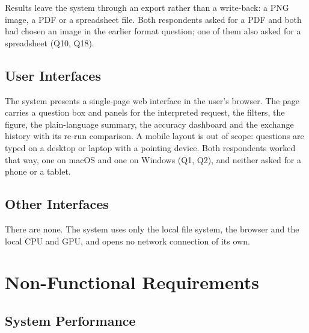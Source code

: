 \documentclass[12pt,a4paper]{report}
\begin{document}
Results leave the system through an export rather than a write-back: a PNG
image, a PDF or a spreadsheet file. Both respondents asked for a PDF and both
had chosen an image in the earlier format question; one of them also asked
for a spreadsheet (Q10, Q18).

\section{User Interfaces}
\label{sec:user-interfaces}

The system presents a single-page web interface in the user's browser. The
page carries a question box and panels for the interpreted request, the
filters, the figure, the plain-language summary, the accuracy dashboard and
the exchange history with its re-run comparison. A mobile layout is out of
scope: questions are typed on a desktop or laptop with a pointing device.
Both respondents worked that way, one on macOS and one on Windows (Q1, Q2),
and neither asked for a phone or a tablet.

\section{Other Interfaces}
\label{sec:other-interfaces}

There are none. The system uses only the local file system, the browser and
the local CPU and GPU, and opens no network connection of its own.

\chapter{Non-Functional Requirements}
\label{ch:nfr}

\section{System Performance}
\label{sec:performance}
\end{document}
